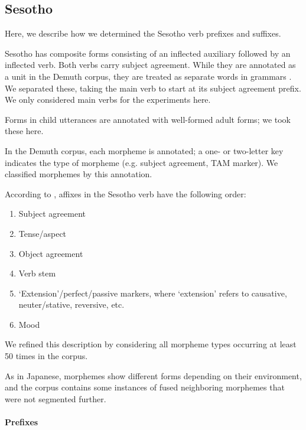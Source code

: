 \documentclass[11pt,letterpaper]{article}
\begin{document}





\subsection{Sesotho}

Here, we describe how we determined the Sesotho verb prefixes and suffixes.

Sesotho has composite forms consisting of an inflected auxiliary followed by an inflected verb.
Both verbs carry subject agreement.
While they are annotated as a unit in the Demuth corpus, they are treated as separate words in grammars \citep{doke1967textbook,guma1971outline}.
We separated these, taking the main verb to start at its subject agreement prefix.
We only considered main verbs for the experiments here.

Forms in child utterances are annotated with well-formed adult forms; we took these here.

In the Demuth corpus, each morpheme is annotated; a one- or two-letter key indicates the type of morpheme (e.g. subject agreement, TAM marker).
We classified morphemes by this annotation.


According to \cite{demuth1992acquisition}, affixes in the Sesotho verb have the following order:
\begin{enumerate}
    \item Subject agreement
    \item Tense/aspect
    \item Object agreement
    \item Verb stem
    \item `Extension'/perfect/passive markers, where `extension' refers to causative, neuter/stative, reversive, etc.
    \item Mood
\end{enumerate}
We refined this description by considering all morpheme types occurring at least 50 times in the corpus.

As in Japanese, morphemes show different forms depending on their environment, and the corpus contains some instances of fused neighboring morphemes that were not segmented further.


\paragraph{Prefixes}
\end{document}
